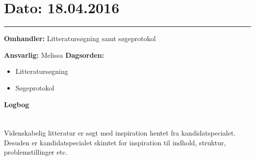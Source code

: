 
\section{Dato: 18.04.2016}
\hrule

\textbf{Omhandler:} Litteratursøgning samt søgeprotokol

\textbf{Ansvarlig:} Melissa
\textbf{Dagsorden:}
\begin{itemize}
	\item Litteratursøgning
	\item Søgeprotokol
\end{itemize}

\textbf{Logbog}
\\
\\ \\
Videnskabelig litteratur er søgt med inspiration hentet fra kandidatspecialet. Desuden er kandidatspecialet skimtet for inspiration til indhold, struktur, problemstillinger etc. 




